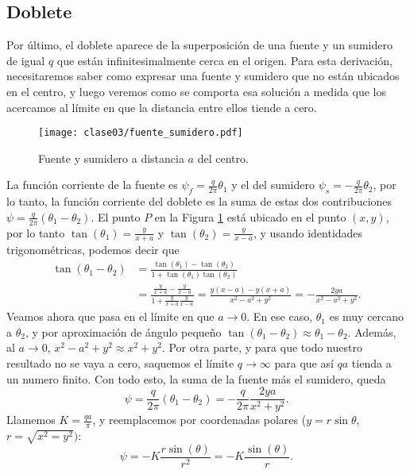 \subsection*{Doblete}
Por último, el doblete aparece de la superposición de una fuente y un sumidero de igual $q$ que están infinitesimalmente cerca en el origen.
Para esta derivación, necesitaremos saber como expresar una fuente y sumidero que no están ubicados en el centro, y luego veremos como se comporta esa solución a medida que los acercamos al límite en que la distancia entre ellos tiende a cero.
%
\begin{figure}[!h]
\centering
\texttt{[image: clase03/fuente\_sumidero.pdf]}
\caption{Fuente y sumidero a distancia $a$ del centro.}
\label{fig:fuente_sumidero}
\end{figure}

La función corriente de la fuente es $\psi_f=\frac{q}{2\pi}\theta_1$ y el del sumidero $\psi_s=-\frac{q}{2\pi}\theta_2$, por lo tanto, la función corriente del doblete es la suma de estas dos contribuciones $\psi=\frac{q}{2\pi}(\theta_1-\theta_2)$.
El punto $P$ en la Figura \ref{fig:fuente_sumidero} está ubicado en el punto $(x,y)$, por lo tanto $\tan(\theta_1)=\frac{y}{x+a}$ y $\tan(\theta_2)=\frac{y}{x-a}$, y usando identidades trigonométricas, podemos decir que
%
\begin{align}
\tan(\theta_1-\theta_2) &= \frac{\tan(\theta_1)-\tan(\theta_2)}{1+\tan(\theta_1)\tan(\theta_2)}\nonumber\\
&=\frac{\frac{y}{x+a}-\frac{y}{x-a}}{1+\frac{y}{x+a}\frac{y}{x-a}} = \frac{y(x-a)-y(x+a)}{x^2-a^2+y^2} = -\frac{2ya}{x^2-a^2+y^2}.
\end{align}
%
Veamos ahora que pasa en el límite en que $a\to0$.
En ese caso, $\theta_1$ es muy cercano a $\theta_2$, y por aproximación de ángulo pequeño $\tan(\theta_1-\theta_2)\approx\theta_1-\theta_2$.
Además, al $a\to0$, $x^2-a^2+y^2\approx x^2+y^2$.
Por otra parte, y para que todo nuestro resultado no se vaya a cero, saquemos el límite $q\to\infty$ para que así $qa$ tienda a un numero finito.
Con todo esto, la suma de la fuente más el sumidero, queda
%
\begin{equation}
\psi=\frac{q}{2\pi}(\theta_1-\theta_2) = -\frac{q}{2\pi}\frac{2ya}{x^2+y^2}.
\end{equation}
%
Llamemos $K=\frac{qa}{\pi}$, y reemplacemos por coordenadas polares ($y=r\sin\theta$, $r=\sqrt{x^2=y^2})$:
%
\begin{equation}
\psi = -K\frac{r\sin(\theta)}{r^2}=-K\frac{\sin(\theta)}{r}.
\end{equation}

